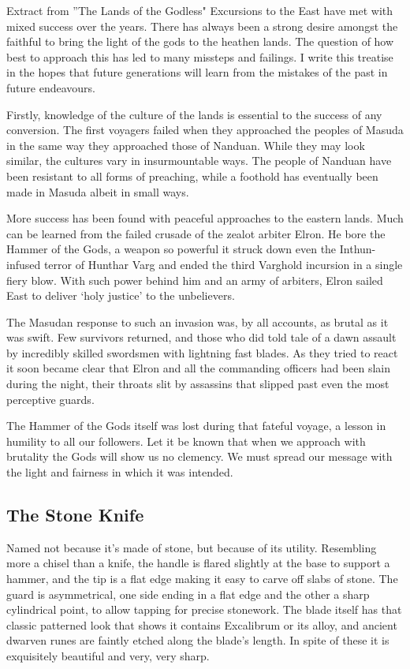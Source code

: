 \begin{DndComment}{Extract from ''The Lands of the Godless"}
Excursions to the East have met with mixed success over the years. There has always been a strong desire amongst the faithful to bring the light of the gods to the heathen lands. The question of how best to approach this has led to many missteps and failings. I write this treatise in the hopes that future generations will learn from the mistakes of the past in future endeavours.

Firstly, knowledge of the culture of the lands is essential to the success of any conversion. The first voyagers failed when they approached the peoples of Masuda in the same way they approached those of Nanduan. While they may look similar, the cultures vary in insurmountable ways. The people of Nanduan have been resistant to all forms of preaching, while a foothold has eventually been made in Masuda albeit in small ways.

More success has been found with peaceful approaches to the eastern lands. Much can be learned from the failed crusade of the zealot arbiter Elron. He bore the Hammer of the Gods, a weapon so powerful it struck down even the Inthun-infused terror of Hunthar Varg and ended the third Varghold incursion in a single fiery blow. With such power behind him and an army of arbiters, Elron sailed East to deliver ‘holy justice’ to the unbelievers.

The Masudan response to such an invasion was, by all accounts, as brutal as it was swift. Few survivors returned, and those who did told tale of a dawn assault by incredibly skilled swordsmen with lightning fast blades. As they tried to react it soon became clear that Elron and all the commanding officers had been slain during the night, their throats slit by assassins that slipped past even the most perceptive guards.

The Hammer of the Gods itself was lost during that fateful voyage, a lesson in humility to all our followers. Let it be known that when we approach with brutality the Gods will show us no clemency. We must spread our message with the light and fairness in which it was intended.
\end{DndComment}

\smallskip

\subsection*{The Stone Knife}

Named not because it's made of stone, but because of its utility. Resembling more a chisel than a knife, the handle is flared slightly at the base to support a hammer, and the tip is a flat edge making it easy to carve off slabs of stone. The guard is asymmetrical, one side ending in a flat edge and the other a sharp cylindrical point, to allow tapping for precise stonework. The blade itself has that classic patterned look that shows it contains Excalibrum or its alloy, and ancient dwarven runes are faintly etched along the blade's length. In spite of these it is exquisitely beautiful and very, very sharp.

